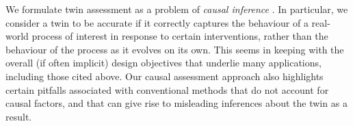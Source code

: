 We formulate twin assessment as a problem of \emph{causal inference} \citep{rubin1974estimating,rubin2005causal,pearl2009causality,hernan2020causal}.
In particular, we consider a twin to be accurate if it correctly captures the behaviour of a real-world process of interest in response to certain interventions, rather than the behaviour of the process as it evolves on its own.
This seems in keeping with the overall (if often implicit) design objectives that underlie many applications, including those cited above.
Our causal assessment approach also highlights certain pitfalls associated with conventional methods that do not account for causal factors, and that can give rise to misleading inferences about the twin as a result.





